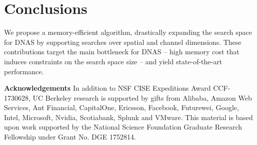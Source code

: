 \documentclass[10pt,twocolumn,letterpaper]{article}
\begin{document}
\section{Conclusions}
We propose a memory-efficient algorithm, drastically expanding the search space for DNAS by supporting searches over spatial and channel dimensions. These contributions target the main bottleneck for DNAS -- high memory cost that induces constraints on the search space size -- and yield state-of-the-art performance.

\textbf{Acknowledgements} In addition to NSF CISE Expeditions Award CCF-1730628, UC Berkeley research is supported by gifts from Alibaba, Amazon Web Services, Ant Financial, CapitalOne, Ericsson, Facebook, Futurewei, Google, Intel, Microsoft, Nvidia, Scotiabank, Splunk and VMware. This material is based upon work supported by the National Science Foundation Graduate Research Fellowship under Grant No. DGE 1752814.


{\small


}
\end{document}
